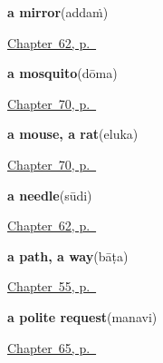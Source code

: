 \noindent\begin{minipage}[t]{\linewidth}
\raggedright
\textbf{a mirror}\enspace\emph{}\enspace(addaṁ)\par
\footnotesize \hyperref[ch:te-made-things]{Chapter~62, p.~\pageref*{ch:te-made-things}}
\end{minipage}\par\smallskip

\noindent\begin{minipage}[t]{\linewidth}
\raggedright
\textbf{a mosquito}\enspace\emph{}\enspace(dōma)\par
\footnotesize \hyperref[ch:te-small-creatures]{Chapter~70, p.~\pageref*{ch:te-small-creatures}}
\end{minipage}\par\smallskip

\noindent\begin{minipage}[t]{\linewidth}
\raggedright
\textbf{a mouse, a rat}\enspace\emph{}\enspace(eluka)\par
\footnotesize \hyperref[ch:te-small-creatures]{Chapter~70, p.~\pageref*{ch:te-small-creatures}}
\end{minipage}\par\smallskip

\noindent\begin{minipage}[t]{\linewidth}
\raggedright
\textbf{a needle}\enspace\emph{}\enspace(sūdi)\par
\footnotesize \hyperref[ch:te-made-things]{Chapter~62, p.~\pageref*{ch:te-made-things}}
\end{minipage}\par\smallskip

\noindent\begin{minipage}[t]{\linewidth}
\raggedright
\textbf{a path, a way}\enspace\emph{}\enspace(bāṭa)\par
\footnotesize \hyperref[ch:te-river-road]{Chapter~55, p.~\pageref*{ch:te-river-road}}
\end{minipage}\par\smallskip

\noindent\begin{minipage}[t]{\linewidth}
\raggedright
\textbf{a polite request}\enspace\emph{}\enspace(manavi)\par
\footnotesize \hyperref[ch:te-more-manners]{Chapter~65, p.~\pageref*{ch:te-more-manners}}
\end{minipage}\par\smallskip

